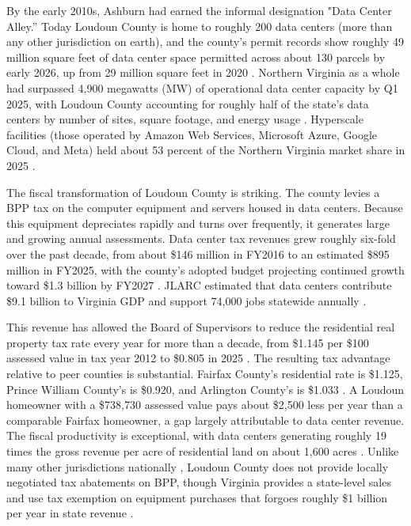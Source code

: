\documentclass[12pt]{article}
\begin{document}
By the early 2010s, Ashburn had earned the informal designation "Data Center Alley.'' Today Loudoun County is home to roughly 200 data centers (more than any other jurisdiction on earth), and the county's permit records show roughly 49 million square feet of data center space permitted across about 130 parcels by early 2026, up from 29 million square feet in 2020 \citep{LoudounCOR2025}. Northern Virginia as a whole had surpassed 4,900 megawatts (MW) of operational data center capacity by Q1 2025, with Loudoun County accounting for roughly half of the state's data centers by number of sites, square footage, and energy usage \citep{JLARC2024}. Hyperscale facilities (those operated by Amazon Web Services, Microsoft Azure, Google Cloud, and Meta) held about 53 percent of the Northern Virginia market share in 2025 \citep{JLARC2024}.

The fiscal transformation of Loudoun County is striking. The county levies a BPP tax on the computer equipment and servers housed in data centers. Because this equipment depreciates rapidly and turns over frequently, it generates large and growing annual assessments. Data center tax revenues grew roughly six-fold over the past decade, from about \$146 million in FY2016 to an estimated \$895 million in FY2025, with the county's adopted budget projecting continued growth toward \$1.3 billion by FY2027 \citep{JLARC2024, LoudounFinance2024}. JLARC estimated that data centers contribute \$9.1 billion to Virginia GDP and support 74,000 jobs statewide annually \citep{JLARC2024}.

This revenue has allowed the Board of Supervisors to reduce the residential real property tax rate every year for more than a decade, from \$1.145 per \$100 assessed value in tax year 2012 to \$0.805 in 2025 \citep{LoudounCOR2025}. The resulting tax advantage relative to peer counties is substantial. Fairfax County's residential rate is \$1.125, Prince William County's is \$0.920, and Arlington County's is \$1.033 \citep{LoudounCOR2025}. A Loudoun homeowner with a \$738,730 assessed value pays about \$2,500 less per year than a comparable Fairfax homeowner, a gap largely attributable to data center revenue. The fiscal productivity is exceptional, with data centers generating roughly 19 times the gross revenue per acre of residential land on about 1,600 acres \citep{LoudounFinance2024}. Unlike many other jurisdictions nationally \citep{Jaros2025}, Loudoun County does not provide locally negotiated tax abatements on BPP, though Virginia provides a state-level sales and use tax exemption on equipment purchases that forgoes roughly \$1 billion per year in state revenue \citep{JLARC2024, GoodJobsFirst2025}.
\end{document}
